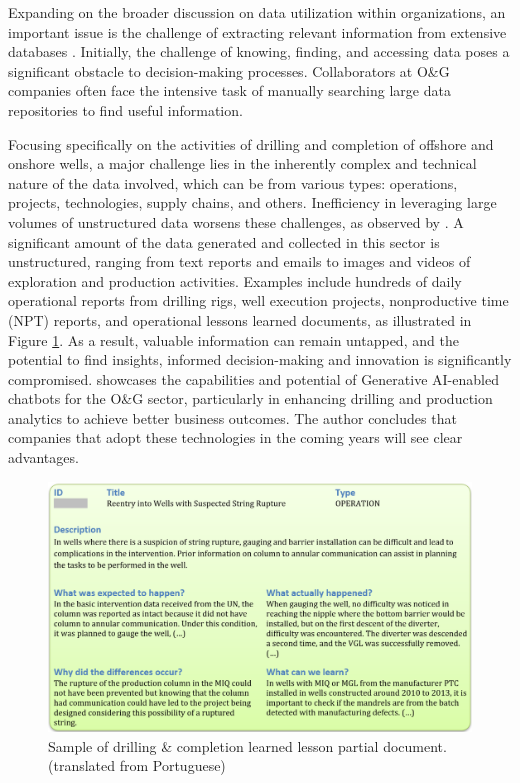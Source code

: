     Expanding on the broader discussion on data utilization within organizations, an important issue is the challenge of extracting relevant information from extensive databases \cite{Singh2023}. 
    Initially, the challenge of knowing, finding, and accessing data poses a significant obstacle to decision-making processes. Collaborators at O\&G companies often face the intensive task of manually searching large data repositories to find useful information.
    
    Focusing specifically on the activities of drilling and completion of offshore and onshore wells, a major challenge lies in the inherently complex and technical nature of the data involved, which can be from various types: operations, projects, technologies, supply chains, and others. 
    Inefficiency in leveraging large volumes of unstructured data worsens these challenges, as observed by \cite{Singh2023}. A significant amount of the data generated and collected in this sector is unstructured, ranging from text reports and emails to images and videos of exploration and production activities. 
    Examples include hundreds of daily operational reports from drilling rigs, well execution projects, nonproductive time (NPT) reports, and operational lessons learned documents, as illustrated in Figure \ref{fig:report_example}. 
    As a result, valuable information can remain untapped, and the potential to find insights, informed decision-making and innovation is significantly compromised.
    \cite{Singh2023} showcases the capabilities and potential of Generative AI-enabled chatbots for the O\&G sector, particularly in enhancing drilling and production analytics to achieve better business outcomes. The author concludes that companies that adopt these technologies in the coming years will see clear advantages.     
    
    \begin{figure}[t]
        \centering
        \includegraphics[width=1\textwidth]{images/report_example.png}
        \caption{Sample of drilling \& completion learned lesson partial document. (translated from Portuguese)}
        \label{fig:report_example}
    \end{figure}           
    
